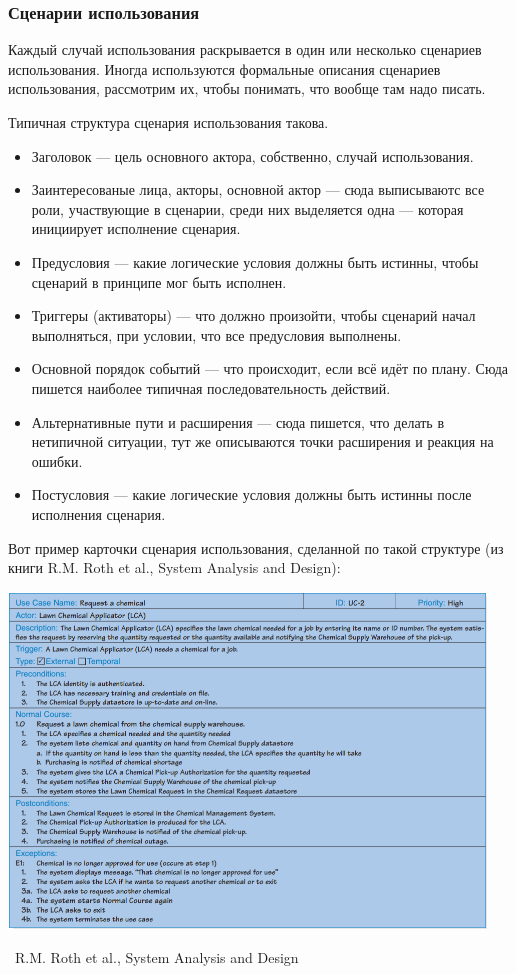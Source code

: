 \documentclass[a5paper]{article}
\newcommand{\attribution}[1] {
    \vspace{-4mm}\begin{flushright}\begin{scriptsize}%
    {\textcopyright\, #1}\end{scriptsize}\end{flushright}
}
\begin{document}
\subsubsection{Сценарии использования}

Каждый случай использования раскрывается в один или несколько сценариев использования. Иногда используются формальные описания сценариев использования, рассмотрим их, чтобы понимать, что вообще там надо писать.

Типичная структура сценария использования такова.

\begin{itemize}
    \item Заголовок --- цель основного актора, собственно, случай использования.
    \item Заинтересованые лица, акторы, основной актор --- сюда выписываютс все роли, участвующие в сценарии, среди них выделяется одна --- которая инициирует исполнение сценария.
    \item Предусловия --- какие логические условия должны быть истинны, чтобы сценарий в принципе мог быть исполнен.
    \item Триггеры (активаторы) --- что должно произойти, чтобы сценарий начал выполняться, при условии, что все предусловия выполнены.
    \item Основной порядок событий --- что происходит, если всё идёт по плану. Сюда пишется наиболее типичная последовательность действий.
    \item Альтернативные пути и расширения --- сюда пишется, что делать в нетипичной ситуации, тут же описываются точки расширения и реакция на ошибки.
    \item Постусловия --- какие логические условия должны быть истинны после исполнения сценария.
\end{itemize}

Вот пример карточки сценария использования, сделанной по такой структуре (из книги  R.M. Roth et al., System Analysis and Design):

\begin{center}
    \includegraphics[width=0.95\textwidth]{useCaseExample.png}
    \attribution{R.M. Roth et al., System Analysis and Design}
\end{center}
\end{document}
